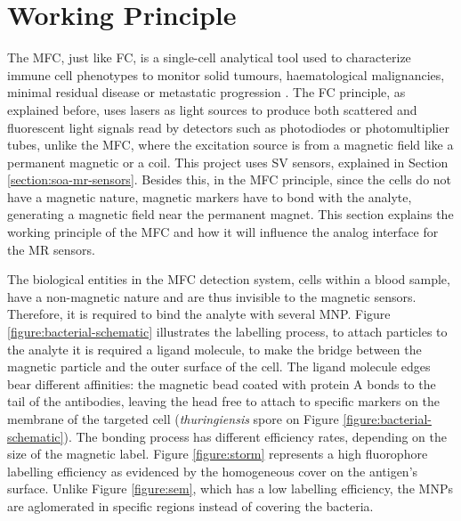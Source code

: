 
\section{Working Principle}
\label{section:mfc-principle}

The \ac{MFC}, just like \ac{FC}, is a single-cell analytical tool used to characterize immune cell phenotypes to monitor solid tumours, haematological malignancies, minimal residual disease or metastatic progression \cite{cpim.40}. The \ac{FC} principle, as explained before, uses lasers as light sources to produce both scattered and fluorescent light signals read by detectors such as photodiodes or photomultiplier tubes, unlike the \ac{MFC}, where the excitation source is from a magnetic field like a permanent magnetic or a coil. This project uses \ac{SV} sensors, explained in Section \ref{section:soa-mr-sensors}. Besides this, in the \ac{MFC} principle, since the cells do not have a magnetic nature, magnetic markers have to bond with the analyte, generating a magnetic field near the permanent magnet. This section explains the working principle of the \ac{MFC} and how it will influence the analog interface for the \ac{MR} sensors.

The biological entities in the \ac{MFC} detection system, cells within a blood sample, have a non-magnetic nature and are thus invisible to the magnetic sensors. Therefore, it is required to bind the analyte with several \ac{MNP}. Figure \ref{figure:bacterial-schematic} illustrates the labelling process, to attach particles to the analyte it is required a ligand molecule, to make the bridge between the magnetic particle and the outer surface of the cell. The ligand molecule edges bear different affinities: the magnetic bead coated with protein A bonds to the tail of the antibodies, leaving the head free to attach to specific markers on the membrane of the targeted cell (\textit{thuringiensis} spore on Figure \ref{figure:bacterial-schematic}). The bonding process has different efficiency rates, depending on the size of the magnetic label. Figure \ref{figure:storm} represents a high fluorophore labelling efficiency as evidenced by the homogeneous cover on the antigen's surface. Unlike Figure \ref{figure:sem}, which has a low labelling efficiency, the \ac{MNP}s are aglomerated in specific regions instead of covering the bacteria.

